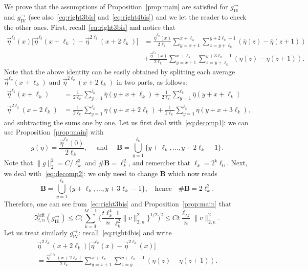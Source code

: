 \documentclass[10pt]{amsart}
\theoremstyle{definition}\newtheorem{defi}[theo]{Definition}\newtheorem{rema}[theo]{Remark}\newtheorem{exam}[theo]{Example}\newtheorem{exem}[theo]{Example}\newtheorem{nota}[theo]{Notation}
\newcommand{\bfB}{\mathbf{B}}
\newcommand*{\rmleft}{\mathrm{left}}
\newcommand*{\rmIII}{\mathrm{III}}
\newcommand*{\rmIV}{\mathrm{IV}}
\newcommand{\mf}[1]{{\mathfrak #1}}
\renewcommand\vec[1]{\overrightarrow{#1}}
\renewcommand{\bar}{\overline}
\renewcommand{\leq}{\leqslant}
\begin{document}
We prove that the assumptions of Proposition~\ref{prop:main} are satisfied for $g_{\rmIII}^\rightarrow$ and $g_{\rmIV}^\rightarrow$ (see also~\eqref{eq:right3bis} and~\eqref{eq:right4bis}) and we let the reader to check the other ones. First, recall~\eqref{eq:right3bis} and notice that
\begin{align}\label{eq:decomp1}
\vec\eta^{\ell_k}(x)\Big[\vec\eta^{\ell_k}(x+\ell_k)-\vec\eta^{2\ell_k}(x+2\ell_k)\Big] & = \frac{\vec\eta^{\ell_k}(x)}{2\ell_k}\sum_{y=x+1}^{x+\ell_k} \sum_{z=y+\ell_k}^{y+2\ell_k-1} (\bar\eta(z)-\bar\eta(z+1)) \!\!
\\ \label{eq:decomp2}
& + \frac{\vec\eta^{\ell_k}(x)}{2\ell_k} \sum_{y=x+1}^{x+\ell_k} \sum_{z=y+\ell_k}^{y+3\ell_k-1} (\bar\eta(z)-\bar\eta(z+1)). \!\!
\end{align}
Note that the above identity can be easily obtained by splitting each average $\vec\eta^{\ell_k}(x+\ell_k)$ and $\vec\eta^{2\ell_k}(x+2\ell_k)$ in two parts, as follows:
\begin{align*}
\vec\eta^{\ell_k}(x+\ell_k) & = \frac{1}{2\ell_k} \sum_{y=1}^{\ell_k} \bar\eta(y+x+\ell_k) + \frac{1}{2\ell_k} \sum_{y=1}^{\ell_k} \bar\eta(y+x+\ell_k) \\
\vec\eta^{2\ell_k}(x+2\ell_k) & = \frac{1}{2\ell_k} \sum_{y=1}^{\ell_k} \bar\eta(y+x+2\ell_k) + \frac{1}{2\ell_k} \sum_{y=1}^{\ell_k} \bar\eta(y+x+3\ell_k),
\end{align*}
and subtracting the sums one by one. Let us first deal with~\eqref{eq:decomp1}: we can use Proposition~\ref{prop:main} with
\[
g(\eta) = \frac{\vec\eta^{\ell_k}(0)}{2\ell_k}, \quad \text{ and } \quad {\bfB} = \bigcup_{y=1}^{\ell_k} \big\{ y+\ell_k, \dots, y+2\ell_k-1\big\}.
\]
Note that $\|g \|_2^2 = C/\ell_k^3$ and $\#{\bfB}=\ell_k^2$, and remember that $\ell_k=2^k\ell_0$. Next, we deal with~\eqref{eq:decomp2}: we only need to change ${\bfB}$ which now reads
\[
{\bfB} = \bigcup_{y=1}^{\ell_k} \big\{ y+\ell_k, \dots, y+3\ell_k-1\big\}, \quad \mathrm{hence} \quad \#{\bfB}=2\ell_k^2.
\]
Therefore, one can see from~\eqref{eq:right3bis} and Proposition~\ref{prop:main} that
\[
\mf I_{t,n}^{\rmleft}(g^\rightarrow_{\rmIII}) \leq C\bigg(\sum_{k=0}^{M-1} \bigg\{ \frac{t\ell_k^4}{n}\frac{1}{\ell_k^2}\|v\|_{2,n}^2\bigg\}^{1/2}\bigg)^2 \leq Ct \frac{\ell_{M}}{n}\|v\|_{2,n}^2.
\]
Let us treat similarly $g_{\rmIV}^\rightarrow$: recall~\eqref{eq:right4bis} and write
\begin{multline}
\vec\eta^{2\ell_k}(x+2\ell_k)\Big[\vec\eta^{\ell_k}(x)-\vec\eta^{2\ell_k}(x)\Big] \\= \frac{\vec\eta^{2\ell_k}(x+2\ell_k)}{2\ell_k}\sum_{y=x+1}^{x+\ell_k} \sum_{z=y}^{y+\ell_k-1} (\bar\eta(z)-\bar\eta(z+1)). \label{eq:decomp3}
\end{multline}
\end{document}
